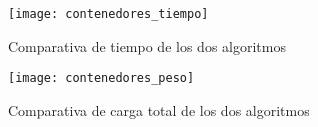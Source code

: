 \begin{figure}[h]\texttt{[image: contenedores\_tiempo]} \centering
\caption{Comparativa de tiempo de los dos algoritmos} \end{figure}
\begin{figure}[h]	\texttt{[image: contenedores\_peso]} \centering
	\caption{Comparativa de carga total de los dos algoritmos} \end{figure}


